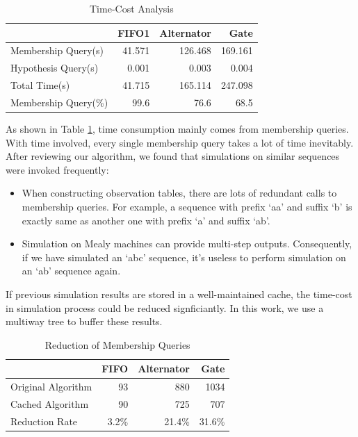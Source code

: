 \documentclass[conference, a4paper]{IEEEtran}
\begin{document}
\begin{table}[ht]
  \renewcommand{\arraystretch}{1.3}
  \caption{Time-Cost Analysis}
  \label{tabel:timecost}
  \centering
  \begin{tabular}{l||rrr}
    \hline
    & FIFO1 & Alternator & Gate \\
    \hline\hline
    Membership Query(s) & 41.571 & 126.468 & 169.161 \\
    Hypothesis Query(s) & 0.001 & 0.003 & 0.004 \\
    Total Time(s) & 41.715 & 165.114 & 247.098 \\
    Membership Query(\%) & 99.6 & 76.6 & 68.5 \\
    \hline
  \end{tabular}
\end{table}

As shown in Table \ref{tabel:timecost}, time consumption mainly comes from membership queries.
With time involved, every single membership query takes a lot of time inevitably.
After reviewing our algorithm, we found that simulations on similar sequences were invoked frequently:

\begin{itemize}
  \item When constructing observation tables, there are lots of redundant calls to membership
    queries. For example, a sequence with prefix `aa' and suffix `b' is exactly same as another one
    with prefix `a' and suffix `ab'.
  \item Simulation on Mealy machines can provide multi-step outputs.  Consequently, if we have
    simulated an `abc' sequence, it's useless to perform simulation on an `ab' sequence again.
\end{itemize}

If previous simulation results are stored in a well-maintained cache, the time-cost in
simulation process could be reduced signficiantly. In this work, we use a multiway tree to buffer
these results.

\begin{table}[ht]
  \renewcommand{\arraystretch}{1.3}
  \caption{Reduction of Membership Queries}
  \label{tabel:cacheoptimization}
  \centering
  \begin{tabular}{l||rrr}
    \hline
    & FIFO & Alternator & Gate \\
    \hline\hline
    Original Algorithm & 93 & 880 & 1034 \\
    Cached Algorithm & 90 & 725 & 707 \\
    Reduction Rate & 3.2\% & 21.4\% & 31.6\% \\
    \hline
  \end{tabular}
\end{table}
\end{document}
